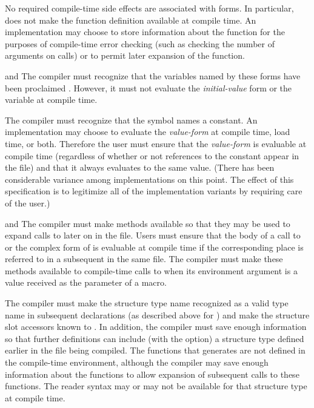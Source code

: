 \begin{newer}
\begin{flushdesc}
\item[\cdf{defun}]
No required compile-time side effects are associated with  forms.
    In particular,  does not make the function definition available
    at compile time.  An implementation may choose to store information
    about the function for the purposes of compile-time error checking
    (such as checking the number of arguments on calls) or to permit later
     expansion of the function.

\item[\cdf{defvar} and \cdf{defparameter}]
The compiler must recognize that the variables
    named by these forms have been proclaimed .  However, it must
    not evaluate the {\it initial-value} form or  the variable at compile
    time.

\item[\cdf{defconstant}]
The compiler must recognize that the symbol names a
    constant.  An implementation may choose to evaluate the {\it value-form} at
    compile time, load time, or both.  Therefore the user must ensure that
    the {\it value-form} is evaluable at compile time (regardless of whether or
    not references to the constant appear in the file) and that it always
    evaluates to the same value.  
    (There has been considerable
variance among implementations on this point.  The effect of this specification is
to legitimize all of the implementation variants by requiring care of the user.)

\item[\cdf{defsetf} and \cdf{define-setf-method}]
The compiler must make  methods
    available so that they may be used to expand calls to  later on in
    the file.  Users must ensure that the body of a call
    to  or
    the complex form of  is evaluable at compile time if the
    corresponding place is referred to in a subsequent  in the same
    file.  The compiler must make these  methods available to 
    compile-time calls to  when its environment argument is
    a value received as the  parameter of a macro.
     
\item[\cdf{defstruct}]
The compiler must make the structure type name recognized
    as a valid type name in subsequent declarations (as described above
    for ) and
    make the structure slot accessors known to .
    In addition, the
    compiler must save enough information so that
    further  definitions can include (with the 
    option) a structure type defined
    earlier in the file being compiled.  The functions that 
    generates are not defined in the compile-time environment, although
    the compiler may save enough information about the functions to allow
     expansion of
    subsequent calls to these functions.  The  reader syntax may or may not be 
    available for that structure type at compile time.


\end{flushdesc}
\end{newer}
